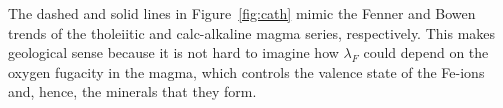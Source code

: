 The dashed and solid lines in Figure~\ref{fig:cath} mimic the Fenner
and Bowen trends of the tholeiitic and calc-alkaline magma series,
respectively. This makes geological sense because it is not hard to
imagine how $\lambda_F$ could depend on the oxygen fugacity in the
magma, which controls the valence state of the Fe-ions and, hence, the
minerals that they form.
